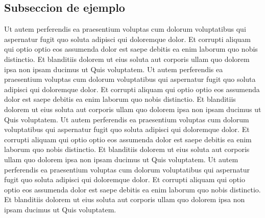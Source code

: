     \subsection{Subseccion de ejemplo}
        Ut autem perferendis ea praesentium voluptas cum dolorum voluptatibus qui aspernatur fugit quo soluta adipisci qui doloremque dolor. Et corrupti aliquam qui optio optio eos assumenda dolor est saepe debitis ea enim laborum quo nobis distinctio. Et blanditiis dolorem ut eius soluta aut corporis ullam quo dolorem ipsa non ipsam ducimus ut Quis voluptatem.
        \newline 
        Ut autem perferendis ea praesentium voluptas cum dolorum voluptatibus qui aspernatur fugit quo soluta adipisci qui doloremque dolor. Et corrupti aliquam qui optio optio eos assumenda dolor est saepe debitis ea enim laborum quo nobis distinctio. Et blanditiis dolorem ut eius soluta aut corporis ullam quo dolorem ipsa non ipsam ducimus ut Quis voluptatem.
        \newline 
        Ut autem perferendis ea praesentium voluptas cum dolorum voluptatibus qui aspernatur fugit quo soluta adipisci qui doloremque dolor. Et corrupti aliquam qui optio optio eos assumenda dolor est saepe debitis ea enim laborum quo nobis distinctio. Et blanditiis dolorem ut eius soluta aut corporis ullam quo dolorem ipsa non ipsam ducimus ut Quis voluptatem.
        \newline 
        Ut autem perferendis ea praesentium voluptas cum dolorum voluptatibus qui aspernatur fugit quo soluta adipisci qui doloremque dolor. Et corrupti aliquam qui optio optio eos assumenda dolor est saepe debitis ea enim laborum quo nobis distinctio. Et blanditiis dolorem ut eius soluta aut corporis ullam quo dolorem ipsa non ipsam ducimus ut Quis voluptatem.
